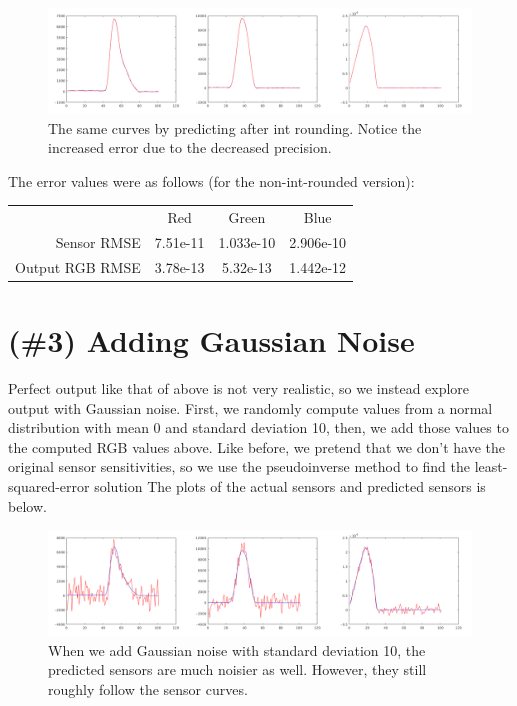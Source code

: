 \documentclass{article}
\begin{document}
\begin{figure}[!ht]
	\centering
	\includegraphics[width=160mm]{figs/sensors_introunded_chanall.png}
	\caption{The same curves by predicting after int rounding. Notice the 
        increased error due to the decreased precision.}
\end{figure}



The error values were as follows (for the non-int-rounded version):

\begin{tabular}{r | c c c}
                    & Red      & Green     & Blue      \\
    Sensor RMSE     & 7.51e-11 & 1.033e-10 & 2.906e-10 \\
    Output RGB RMSE & 3.78e-13 & 5.32e-13  & 1.442e-12 \\
\end{tabular}

\section{(\#3) Adding Gaussian Noise}

Perfect output like that of above is not very realistic, so we instead explore output with Gaussian 
noise. First, we randomly compute values from a normal distribution with mean 0 
and standard deviation 10, then, we add those values to the computed RGB values 
above. Like before, we pretend that we don't have the original sensor sensitivities, 
so we use the pseudoinverse method to find the least-squared-error solution The 
plots of the actual sensors and predicted sensors is below.

\begin{figure}[!ht]
	\centering
	\includegraphics[width=160mm]{figs/sensors_noise_stddev10_unclipped_chanall.png}
	\caption{When we add Gaussian noise with standard deviation 10, the predicted 
        sensors are much noisier as well. However, they still roughly follow the 
        sensor curves.}
\end{figure}
\end{document}
